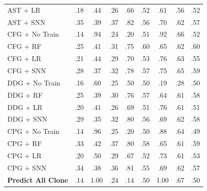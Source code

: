 \begin{table}[!htbp]
\begin{tabular}{@{}lcccccccc@{}}
AST + LR
& .18 & .44 & .26 & .66
& .52 & .61 & .56 & .52 \\

AST + SNN
& .35 & .39 & .37 & .82
& .56 & .70 & .62 & .57 \\

\midrule

CFG + No Train
& .14 & .94 & .24 & .20
& .51 & .92 & .66 & .52 \\

CFG + RF
& .25 & .41 & .31 & .75
& .60 & .65 & .62 & .60 \\

CFG + LR
& .21 & .44 & .29 & .70
& .53 & .76 & .63 & .55 \\

CFG + SNN
& .28 & .37 & .32 & .78
& .57 & .75 & .65 & .59 \\

\midrule

DDG + No Train
& .16 & .60 & .25 & .50
& .50 & .19 & .28 & .50 \\

DDG + RF
& .25 & .39 & .30 & .76
& .57 & .64 & .61 & .58 \\

DDG + LR
& .20 & .41 & .26 & .69
& .51 & .76 & .61 & .51 \\

DDG + SNN
& .29 & .35 & .32 & .80
& .56 & .69 & .62 & .58 \\

\midrule

CPG + No Train
& .14 & .96 & .25 & .20
& .50 & .88 & .64 & .49 \\

CPG + RF
& .33 & .42 & .37 & .80
& .58 & .65 & .61 & .59 \\

CPG + LR
& .20 & .50 & .29 & .67
& .52 & .73 & .61 & .53 \\

CPG + SNN
& .34 & .38 & .36 & .81
& .55 & .69 & .62 & .57 \\

\midrule

\textbf{Predict All Clone}
& .14 & 1.00 & .24 & .14
& .50 & 1.00 & .67 & .50 \\

\bottomrule
\end{tabular}
\end{table}
